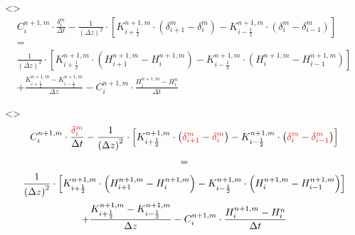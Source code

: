 \documentclass[xcolor=dvipsnames]{beamer}
\newcounter{fourthElement}
\newcounter{fifthElement}
\begin{document}
\begin{frame}[t]
  \only<\thefourthElement>{
    \begin{gather*}
      C_i^{n+1,m} \cdot \frac{\delta_i^m}{\Delta t} - \frac{1}{\left(\Delta z\right)^2} \cdot \left[K_{i+\frac{1}{2}}^{n+1,m} \cdot \left(\delta_{i+1}^m - \delta_i^m\right) - K_{i-\frac{1}{2}}^{n+1,m} \cdot \left(\delta_i^m - \delta_{i-1}^m\right)\right] \\[+0.5mm]
      = \\[+0.5mm]
      \frac{1}{\left(\Delta z\right)^2} \cdot \left[K_{i+\frac{1}{2}}^{n+1,m} \cdot \left(H_{i+1}^{n+1,m} - H_i^{n+1,m}\right) - K_{i-\frac{1}{2}}^{n+1,m} \cdot \left(H_{i}^{n+1,m} - H_{i-1}^{n+1,m}\right)\right] \\[+0.5mm]
      + \frac{K_{i+\frac{1}{2}}^{n+1,m} - K_{i-\frac{1}{2}}^{n+1,m}}{\Delta z} - C_i^{n+1,m} \cdot \frac{H_i^{n+1,m} - H_i^n}{\Delta t}
    \end{gather*}}

\only<\thefifthElement>{
    \begin{gather*}
      C_i^{n+1,m} \cdot \frac{\textcolor{red}{\delta_i^m}}{\Delta t} - \frac{1}{\left(\Delta z\right)^2} \cdot \left[K_{i+\frac{1}{2}}^{n+1,m} \cdot \left(\textcolor{red}{\delta_{i+1}^m} - \textcolor{red}{\delta_i^m}\right) - K_{i-\frac{1}{2}}^{n+1,m} \cdot \left(\textcolor{red}{\delta_i^m} - \textcolor{red}{\delta_{i-1}^m}\right)\right] \\[+0.5mm]
      = \\[+0.5mm]
      \frac{1}{\left(\Delta z\right)^2} \cdot \left[K_{i+\frac{1}{2}}^{n+1,m} \cdot \left(H_{i+1}^{n+1,m} - H_i^{n+1,m}\right) - K_{i-\frac{1}{2}}^{n+1,m} \cdot \left(H_{i}^{n+1,m} - H_{i-1}^{n+1,m}\right)\right] \\[+0.5mm]
      + \frac{K_{i+\frac{1}{2}}^{n+1,m} - K_{i-\frac{1}{2}}^{n+1,m}}{\Delta z} - C_i^{n+1,m} \cdot \frac{H_i^{n+1,m} - H_i^n}{\Delta t}
    \end{gather*}}

\end{frame}
\end{document}
